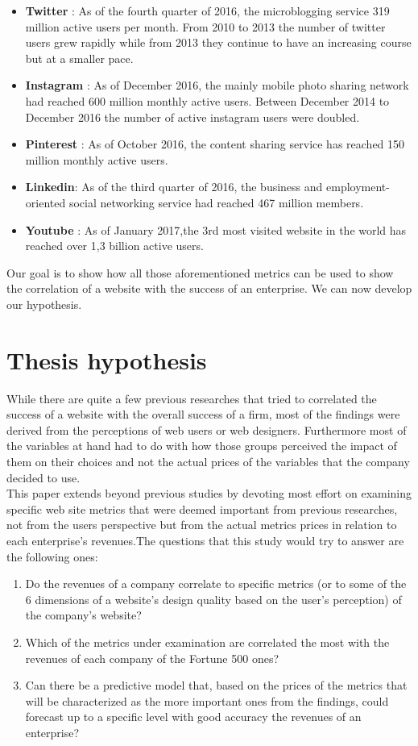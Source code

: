 \documentclass{book}
\begin{document}
\begin{itemize}
\item \textbf{Twitter} : As of the fourth quarter of 2016, the microblogging service 319 million active users per month.\cite{key28} From 2010 to 2013 the number of twitter users grew rapidly while from 2013 they continue to have an increasing course but at a smaller pace.
\item \textbf{Instagram} : As of December 2016, the mainly mobile photo sharing network had reached 600 million monthly active users.\cite{key29} Between December 2014 to December 2016 the number of active instagram users were doubled.
\item \textbf{Pinterest} : As of October 2016, the content sharing service has reached 150 million monthly active users.\cite{key47}
\item\textbf{Linkedin}: As of the third quarter of 2016, the business and employment-oriented social networking service had reached 467 million members.\cite{key31}
\item\textbf{Youtube} : As of January 2017,the 3rd most visited website in the world has reached over 1,3 billion active users.\cite{key32}
\end{itemize}
Our goal is to show how all those aforementioned metrics can be used to show the correlation of a website with the success of an enterprise. We can now develop our hypothesis. 

\section{Thesis hypothesis}
While there are quite a few previous researches that tried to correlated the success of a website with the overall success of a firm, most of the findings were derived from the perceptions of web users or web designers. Furthermore most of the variables at hand had to do with how those groups perceived the impact of them on their choices and not the actual prices of the variables that the company decided to use.\\
This paper extends beyond previous studies by devoting most effort on examining specific web site metrics that were deemed important from previous researches, not from the users perspective but from the actual metrics prices in relation to each enterprise's revenues.The questions that this study would try to answer are the following ones:
\begin{enumerate}
\item Do the revenues of a company correlate to specific metrics (or to some of the 6 dimensions of a website's design quality based on the user's perception) of the company's website?
\item Which of the metrics under examination are correlated the most with the revenues of each company of the Fortune 500 ones?
\item Can there be a predictive model that, based on the prices of the metrics that will be characterized as the more important ones from the findings, could forecast up to a specific level with good accuracy the revenues of an enterprise?
\end{enumerate}
\end{document}
